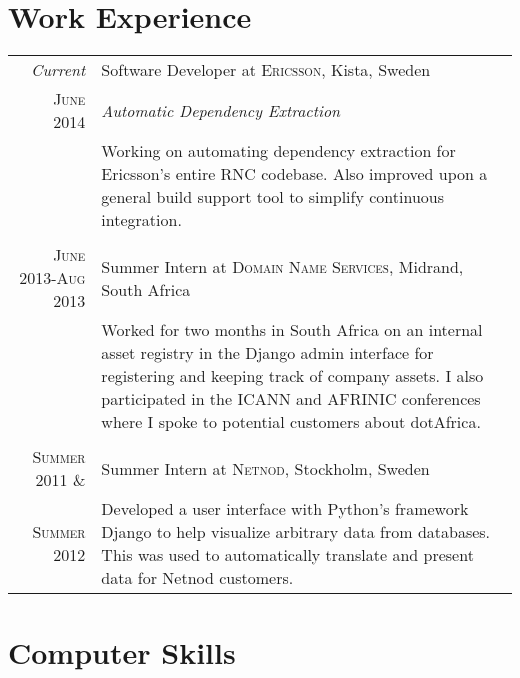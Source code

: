 \documentclass[a4paper,10pt]{article} %
\begin{document}

\section{Work Experience}

\begin{tabular}{rp{11cm}}
\emph{Current} & Software Developer at \textsc{Ericsson}, Kista, Sweden \\
\textsc{June 2014} & \emph{Automatic Dependency Extraction}\\ 
& \footnotesize{Working on automating dependency extraction for Ericsson’s entire RNC codebase. Also improved upon a general build support tool to simplify continuous integration.}\\
\multicolumn{2}{c}{} \\


\textsc{June 2013-Aug 2013} & Summer Intern at \textsc{Domain Name Services}, Midrand, South Africa \emph{}\\
& \footnotesize{Worked for two months in South Africa on an internal asset registry in the Django admin interface for registering and keeping track of company assets. I also participated in the ICANN and AFRINIC conferences where I spoke to potential customers about dotAfrica.}\\
\multicolumn{2}{c}{} \\


\textsc{Summer 2011 \&} & Summer Intern at \textsc{Netnod}, Stockholm, Sweden \emph{}\\
 \textsc{Summer 2012} & \footnotesize{Developed a user interface with Python’s framework Django to help visualize arbitrary data from databases. This was used to automatically translate and present data for Netnod customers.}
\end{tabular}




\section{Computer Skills}
\end{document}
